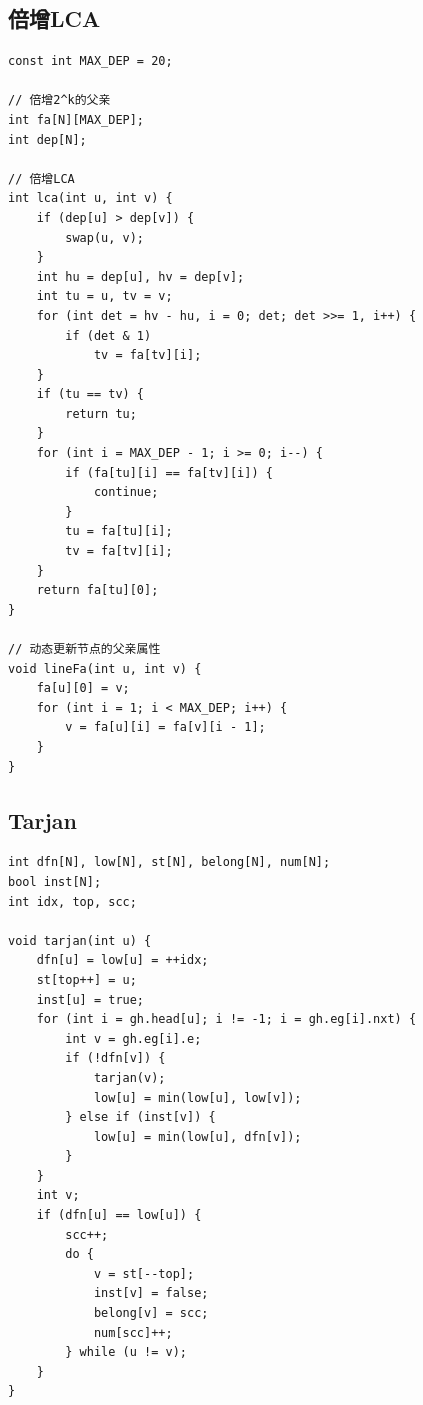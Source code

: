 \documentclass[twoside]{article}
\begin{document}
\subsection{倍增LCA}
\begin{lstlisting}
const int MAX_DEP = 20;

// 倍增2^k的父亲
int fa[N][MAX_DEP];
int dep[N];

// 倍增LCA
int lca(int u, int v) {
    if (dep[u] > dep[v]) {
        swap(u, v);
    }
    int hu = dep[u], hv = dep[v];
    int tu = u, tv = v;
    for (int det = hv - hu, i = 0; det; det >>= 1, i++) {
        if (det & 1)
            tv = fa[tv][i];
    }
    if (tu == tv) {
        return tu;
    }
    for (int i = MAX_DEP - 1; i >= 0; i--) {
        if (fa[tu][i] == fa[tv][i]) {
            continue;
        }
        tu = fa[tu][i];
        tv = fa[tv][i];
    }
    return fa[tu][0];
}

// 动态更新节点的父亲属性
void lineFa(int u, int v) {
    fa[u][0] = v;
    for (int i = 1; i < MAX_DEP; i++) {
        v = fa[u][i] = fa[v][i - 1];
    }
}\end{lstlisting}
\subsection{Tarjan}
\begin{lstlisting}
int dfn[N], low[N], st[N], belong[N], num[N];
bool inst[N];
int idx, top, scc;

void tarjan(int u) {
    dfn[u] = low[u] = ++idx;
    st[top++] = u;
    inst[u] = true;
    for (int i = gh.head[u]; i != -1; i = gh.eg[i].nxt) {
        int v = gh.eg[i].e;
        if (!dfn[v]) {
            tarjan(v);
            low[u] = min(low[u], low[v]);
        } else if (inst[v]) {
            low[u] = min(low[u], dfn[v]);
        }
    }
    int v;
    if (dfn[u] == low[u]) {
        scc++;
        do {
            v = st[--top];
            inst[v] = false;
            belong[v] = scc;
            num[scc]++;
        } while (u != v);
    }
}\end{lstlisting}
\end{document}
